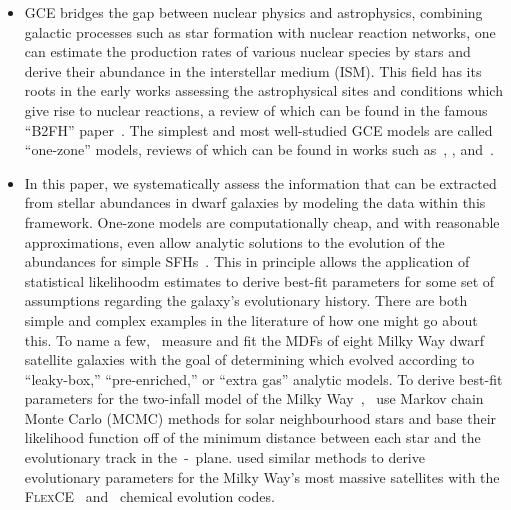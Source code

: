 \documentclass[ms.tex]{subfiles}
\begin{document}
\begin{itemize}
	\item GCE bridges the gap between nuclear physics and astrophysics,
	combining galactic processes such as star formation with nuclear reaction
	networks, one can estimate the production rates of various nuclear species
	by stars and derive their abundance in the interstellar medium (ISM).
	This field has its roots in the early works assessing the astrophysical
	sites and conditions which give rise to nuclear reactions, a review of
	which can be found in the famous ``B2FH'' paper~\citep{Burbidge1957}.
	The simplest and most well-studied GCE models are called ``one-zone''
	models, reviews of which can be found in works such as~\citet{Tinsley1980},
	\citet{Pagel2009}, and~\citet{Matteucci2012, Matteucci2021}.

	\item In this paper, we systematically assess the information that can be
	extracted from stellar abundances in dwarf galaxies by modeling the data
	within this framework.
	One-zone models are computationally cheap, and with reasonable
	approximations, even allow analytic solutions to the evolution of the
	abundances for simple SFHs~\citep*[e.g.][]{Weinberg2017}.
	This in principle allows the application of statistical likelihoodm
	estimates to derive best-fit parameters for some set of assumptions
	regarding the galaxy's evolutionary history.
	There are both simple and complex examples in the literature of how one
	might go about this.
	To name a few,~\citet{Kirby2011} measure and fit the MDFs of eight Milky
	Way dwarf satellite galaxies with the goal of determining which evolved
	according to ``leaky-box,'' ``pre-enriched,'' or ``extra gas'' analytic
	models.
	To derive best-fit parameters for the two-infall model of the Milky
	Way~\citep[e.g.][]{Chiappini1997},~\citet{Spitoni2020} use Markov chain
	Monte Carlo (MCMC) methods for solar neighbourhood stars and base their
	likelihood function off of the minimum distance between each star and the
	evolutionary track in the~\afe-\feh~plane.
	\citet{Hasselquist2021} used similar methods to derive evolutionary
	parameters for the Milky Way's most massive satellites with the
	\textsc{FlexCE}~\citep{Andrews2017} and~\citet{Lian2018, Lian2020} chemical
	evolution codes.


\end{itemize}
\end{document}
